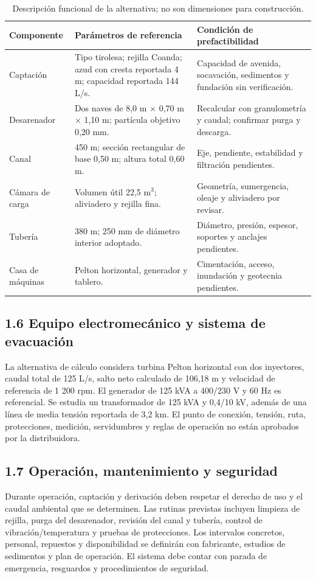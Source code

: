 \documentclass[11pt,a4paper]{article}
\begin{document}
\begin{table}[H]\centering\small
\begin{tabularx}{\textwidth}{p{2.5cm}p{5.0cm}Y}
\toprule Componente & Parámetros de referencia & Condición de prefactibilidad\\\midrule
Captación & Tipo tirolesa; rejilla Coanda; azud con cresta reportada 4 m; capacidad reportada 144 L/s. & Capacidad de avenida, socavación, sedimentos y fundación sin verificación.\\
Desarenador & Dos naves de 8,0 m × 0,70 m × 1,10 m; partícula objetivo 0,20 mm. & Recalcular con granulometría y caudal; confirmar purga y descarga.\\
Canal & 450 m; sección rectangular de base 0,50 m; altura total 0,60 m. & Eje, pendiente, estabilidad y filtración pendientes.\\
Cámara de carga & Volumen útil 22,5 m$^3$; aliviadero y rejilla fina. & Geometría, sumergencia, oleaje y aliviadero por revisar.\\
Tubería & 380 m; 250 mm de diámetro interior adoptado. & Diámetro, presión, espesor, soportes y anclajes pendientes.\\
Casa de máquinas & Pelton horizontal, generador y tablero. & Cimentación, acceso, inundación y geotecnia pendientes.\\
\bottomrule
\end{tabularx}\caption{Descripción funcional de la alternativa; no son dimensiones para construcción.}\end{table}

\subsection*{1.6 Equipo electromecánico y sistema de evacuación}
La alternativa de cálculo considera turbina Pelton horizontal con dos inyectores, caudal total de 125 L/s, salto neto calculado de 106,18 m y velocidad de referencia de 1 200 rpm. El generador de 125 kVA a 400/230 V y 60 Hz es referencial. Se estudia un transformador de 125 kVA y 0,4/10 kV, además de una línea de media tensión reportada de 3,2 km. El punto de conexión, tensión, ruta, protecciones, medición, servidumbres y reglas de operación no están aprobados por la distribuidora.

\subsection*{1.7 Operación, mantenimiento y seguridad}
Durante operación, captación y derivación deben respetar el derecho de uso y el caudal ambiental que se determinen. Las rutinas previstas incluyen limpieza de rejilla, purga del desarenador, revisión del canal y tubería, control de vibración/temperatura y pruebas de protecciones. Los intervalos concretos, personal, repuestos y disponibilidad se definirán con fabricante, estudios de sedimentos y plan de operación. El sistema debe contar con parada de emergencia, resguardos y procedimientos de seguridad.
\end{document}
